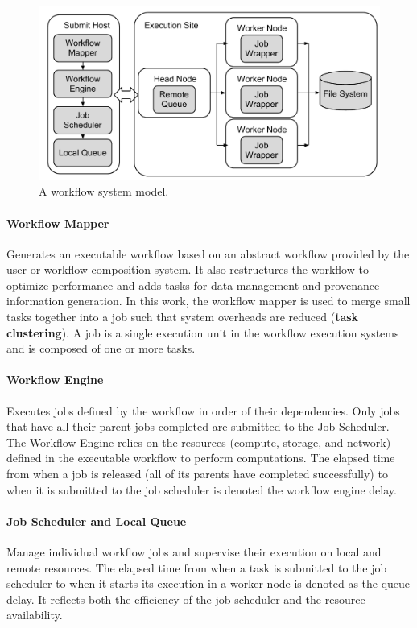 \begin{figure}[!htb]
\centering
  \includegraphics[width=0.95\linewidth]{figures/model/execution.pdf}
  \caption{A workflow system model.}
  \label{fig:model_system}
\end{figure}

\paragraph{Workflow Mapper} Generates an executable workflow based on an abstract workflow provided by the user or workflow composition system. It also restructures the workflow to optimize performance and adds tasks for data management and provenance information generation. In this work, the workflow mapper is used to merge small tasks together into a job such that system overheads are reduced (\textbf{task clustering}). A job is a single execution unit in the workflow execution systems and is composed of one or more tasks. 


\paragraph{Workflow Engine} Executes jobs defined by the workflow in order of their dependencies. Only jobs that have all their parent jobs completed are submitted to the Job Scheduler. The Workflow Engine relies on the resources (compute, storage, and network) defined in the executable workflow to perform computations. The elapsed time from when a job is released (all of its parents have completed successfully) to when it is submitted to the job scheduler is denoted the workflow engine delay. %

\paragraph{Job Scheduler and Local Queue} Manage individual workflow jobs and supervise their execution on local and remote resources. The elapsed time from when a task is submitted to the job scheduler to when it starts its execution in a worker node is denoted as the queue delay. It reflects both the efficiency of the job scheduler and the resource availability. 

